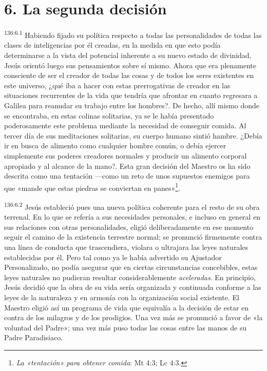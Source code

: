 \section*{6. La segunda decisión}
\par
\textsuperscript{136:6.1} Habiendo fijado su política respecto a todas las personalidades de todas las clases de inteligencias por él creadas, en la medida en que esto podía determinarse a la vista del potencial inherente a su nuevo estado de divinidad, Jesús orientó luego sus pensamientos sobre sí mismo. Ahora que era plenamente consciente de ser el creador de todas las cosas y de todos los seres existentes en este universo, ¿qué iba a hacer con estas prerrogativas de creador en las situaciones recurrentes de la vida que tendría que afrontar en cuanto regresara a Galilea para reanudar su trabajo entre los hombres?. De hecho, allí mismo donde se encontraba, en estas colinas solitarias, ya se le había presentado poderosamente este problema mediante la necesidad de conseguir comida. Al tercer día de sus meditaciones solitarias, su cuerpo humano sintió hambre. ¿Debía ir en busca de alimento como cualquier hombre común, o debía ejercer simplemente sus poderes creadores normales y producir un alimento corporal apropiado y al alcance de la mano?. Esta gran decisión del Maestro os ha sido descrita como una tentación ---como un reto de unos supuestos enemigos para que «mande que estas piedras se conviertan en panes»\footnote{\textit{La «tentación» para obtener comida}: Mt 4:3; Lc 4:3.}.

\par
\textsuperscript{136:6.2} Jesús estableció pues una nueva política coherente para el resto de su obra terrenal. En lo que se refería a sus necesidades personales, e incluso en general en sus relaciones con otras personalidades, eligió deliberadamente en ese momento seguir el camino de la existencia terrestre normal; se pronunció firmemente contra una línea de conducta que trascendiera, violara o ultrajara las leyes naturales establecidas por él. Pero tal como ya le había advertido su Ajustador Personalizado, no podía asegurar que en ciertas circunstancias concebibles, estas leyes naturales no pudieran resultar considerablemente \textit{aceleradas}. En principio, Jesús decidió que la obra de su vida sería organizada y continuada conforme a las leyes de la naturaleza y en armonía con la organización social existente. El Maestro eligió así un programa de vida que equivalía a la decisión de estar en contra de los milagros y de los prodigios. Una vez más se pronunció a favor de «la voluntad del Padre»; una vez más puso todas las cosas entre las manos de su Padre Paradisiaco.

